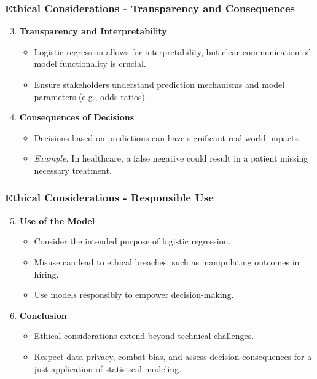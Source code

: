 \documentclass[aspectratio=169]{beamer}
\begin{document}
\begin{frame}[fragile]
    \frametitle{Ethical Considerations - Transparency and Consequences}
    \begin{enumerate}
        \setcounter{enumi}{2}
        \item \textbf{Transparency and Interpretability}
            \begin{itemize}
                \item Logistic regression allows for interpretability, but clear communication of model functionality is crucial.
                \item Ensure stakeholders understand prediction mechanisms and model parameters (e.g., odds ratios).
            \end{itemize}
        \item \textbf{Consequences of Decisions}
            \begin{itemize}
                \item Decisions based on predictions can have significant real-world impacts.
                \item \textit{Example:} In healthcare, a false negative could result in a patient missing necessary treatment.
            \end{itemize}
    \end{enumerate}
\end{frame}

\begin{frame}[fragile]
    \frametitle{Ethical Considerations - Responsible Use}
    \begin{enumerate}
        \setcounter{enumi}{4}
        \item \textbf{Use of the Model}
            \begin{itemize}
                \item Consider the intended purpose of logistic regression.
                \item Misuse can lead to ethical breaches, such as manipulating outcomes in hiring.
                \item Use models responsibly to empower decision-making.
            \end{itemize}
        \item \textbf{Conclusion}
            \begin{itemize}
                \item Ethical considerations extend beyond technical challenges.
                \item Respect data privacy, combat bias, and assess decision consequences for a just application of statistical modeling.
            \end{itemize}
    \end{enumerate}
\end{frame}
\end{document}
